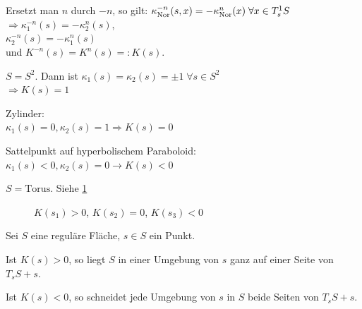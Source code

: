 \begin{bemerkung}%
    Ersetzt man $n$ durch $-n$, so gilt: $\kappa_{\textnormal{Nor}}^{-n}(s, x) = - \kappa_{\textnormal{Nor}}^n(x)\; \forall x \in T_s^1 S$\\
    $\Rightarrow \kappa_1^{-n}(s) = - \kappa_2^n(s)$,\\
    $\kappa_2^{-n}(s) = - \kappa_1^n (s)$\\
    und $K^{-n}(s) = K^n(s) =: K(s)$.
\end{bemerkung}

\begin{beispiel}
    \begin{bspenum}
        \item $S = S^2$. Dann ist $\kappa_1(s) = \kappa_2(s) = \pm 1\;\forall s \in S^2$\\
              $\Rightarrow K(s) = 1$
        \item Zylinder:\\
              $\kappa_1(s) = 0, \kappa_2(s) = 1 \Rightarrow K(s) = 0$
        \item Sattelpunkt auf hyperbolischem Paraboloid:\\
              $\kappa_1(s) < 0, \kappa_2(s) = 0 \rightarrow K(s) < 0$
        \item $S = \text{Torus}$. Siehe \cref{fig:torus-gauss-kruemmung}\\
            \begin{figure}[htp]
                \centering
                 
                \caption{$K(s_1) > 0$, $K(s_2) = 0$, $K(s_3) < 0$}
                \label{fig:torus-gauss-kruemmung}
            \end{figure}
    \end{bspenum}
\end{beispiel}

\begin{bemerkung}%
    Sei $S$ eine reguläre Fläche, $s \in S$ ein Punkt.
    \begin{bemenum}
        \item Ist $K(s) > 0$, so liegt $S$ in einer Umgebung von $s$
              ganz auf einer Seite von $T_s S + s$.
        \item Ist $K(s) < 0$, so schneidet jede Umgebung von $s$ in $S$
              beide Seiten von $T_s S + s$.
    \end{bemenum}
\end{bemerkung}

